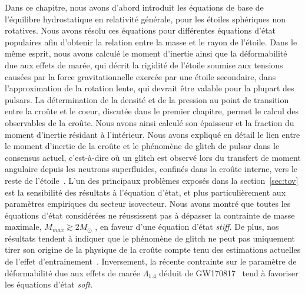 Dans ce chapitre, nous avons d'abord introduit les équations de base de
l'équilibre hydrostatique en relativité générale, pour les étoiles sphériques 
non rotatives. Nous avons résolu ces équations pour différentes équations
d'état populaires afin d'obtenir la relation entre la masse et le rayon de 
l'étoile. 
Dans le même esprit, nous avons calculé le moment d'inertie ainsi que la 
déformabilité due aux effets de marée, qui décrit la rigidité de l'étoile
soumise aux tensions causées par la force gravitationnelle exercée par une
étoile secondaire, dans l'approximation de la rotation lente, qui devrait être 
valable pour la plupart des pulsars. 
La détermination de la densité et de la pression au point de transition entre
la croûte et le coeur, discutée dans le premier chapitre, permet le calcul des
observables de la croûte. Nous avons ainsi calculé son épaisseur et 
la fraction du moment d'inertie résidant à l'intérieur. Nous
avons expliqué en détail le lien entre le moment d'inertie de la croûte et le 
phénomène de glitch de pulsar dans le consensus actuel, c'est-à-dire où un 
glitch est observé lors du transfert de moment angulaire depuis les neutrons 
superfluides, confinés dans la croûte interne, vers le reste de 
l'étoile~\cite{Anderson1975}.
%
L'un des principaux problèmes exposés dans la section~\ref{sec:tov} est la 
sensibilité des résultats à l'équation d'état, et plus particulièrement aux
paramètres empiriques du secteur isovecteur. Nous avons montré que toutes les 
équations d'état considérées ne réussissent pas à dépasser la contrainte de 
masse maximale, $M_{max} \gtrsim 
2M_\odot$ \cite{Demorest2010,Antoniadis2013,Cromartie2020}, en faveur d'une
équation d'état \textit{stiff}. 
De plus, nos résultats tendent à indiquer que le phénomène de glitch ne peut 
pas uniquement tirer son origine de la physique de la croûte compte tenu des 
estimations actuelles de l'effet 
d'entrainement~\cite{Andersson2012,Piekarewicz2014}.
Inversement, la récente contrainte sur le paramètre de déformabilité due aux
effets de marée $\Lambda_{1.4}$ déduit de GW170817~\cite{GW1} tend à favoriser 
les équations d'état \textit{soft}.

